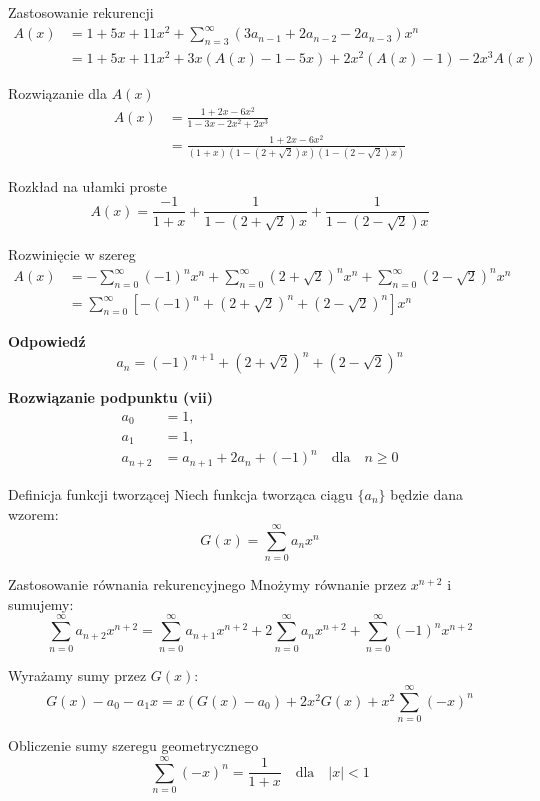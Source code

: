\documentclass{mwart}
\begin{document}
\begin{mdframed}
    Zastosowanie rekurencji
    \begin{align*}
    A(x) &= 1 + 5x + 11x^2 + \sum_{n=3}^{\infty} (3a_{n-1} + 2a_{n-2} - 2a_{n-3}) x^n \\
    &= 1 + 5x + 11x^2 + 3x(A(x) - 1 - 5x) + 2x^2(A(x) - 1) - 2x^3 A(x)
    \end{align*}

    Rozwiązanie dla $A(x)$
    \begin{align*}
    A(x) &= \frac{1 + 2x - 6x^2}{1 - 3x - 2x^2 + 2x^3} \\
    &= \frac{1 + 2x - 6x^2}{(1 + x)(1 - (2 + \sqrt{2})x)(1 - (2 - \sqrt{2})x)}
    \end{align*}

    Rozkład na ułamki proste
    \[
    A(x) = \frac{-1}{1 + x} + \frac{1}{1 - (2 + \sqrt{2})x} + \frac{1}{1 - (2 - \sqrt{2})x}
    \]

    Rozwinięcie w szereg
    \begin{align*}
    A(x) &= -\sum_{n=0}^{\infty} (-1)^n x^n + \sum_{n=0}^{\infty} (2 + \sqrt{2})^n x^n + \sum_{n=0}^{\infty} (2 - \sqrt{2})^n x^n \\
    &= \sum_{n=0}^{\infty} \left[ -(-1)^n + (2 + \sqrt{2})^n + (2 - \sqrt{2})^n \right] x^n
    \end{align*}

    \textbf{Odpowiedź}
    \[
    \boxed{a_n = (-1)^{n+1} + (2 + \sqrt{2})^n + (2 - \sqrt{2})^n}
    \]


    \textbf{Rozwiązanie podpunktu (vii)}
    \begin{align*}
    a_0 &= 1, \\
    a_1 &= 1, \\
    a_{n+2} &= a_{n+1} + 2a_n + (-1)^n \quad \text{dla} \quad n \geq 0
    \end{align*}

    Definicja funkcji tworzącej
    Niech funkcja tworząca ciągu $\{a_n\}$ będzie dana wzorem:
    \[ G(x) = \sum_{n=0}^\infty a_n x^n \]
        
    Zastosowanie równania rekurencyjnego
    Mnożymy równanie przez $x^{n+2}$ i sumujemy:
    \[ \sum_{n=0}^\infty a_{n+2} x^{n+2} = \sum_{n=0}^\infty a_{n+1} x^{n+2} + 2 \sum_{n=0}^\infty a_n x^{n+2} + \sum_{n=0}^\infty (-1)^n x^{n+2} \]
        
    Wyrażamy sumy przez $G(x)$:
    \[ G(x) - a_0 - a_1 x = x(G(x) - a_0) + 2x^2 G(x) + x^2 \sum_{n=0}^\infty (-x)^n \]
        
    Obliczenie sumy szeregu geometrycznego
    \[ \sum_{n=0}^\infty (-x)^n = \frac{1}{1 + x} \quad \text{dla} \quad |x| < 1 \]
        

\end{mdframed}
\end{document}
